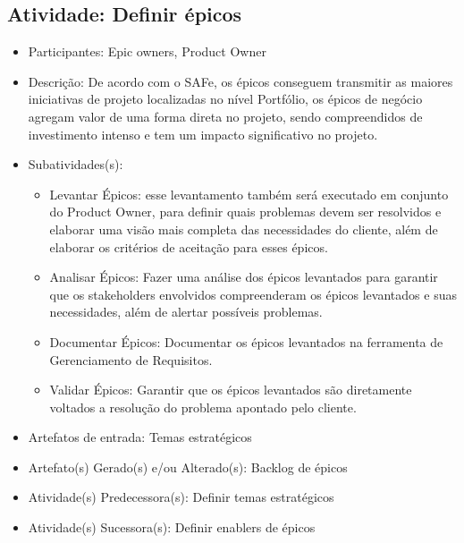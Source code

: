 \subsection{Atividade: Definir épicos}
\begin{itemize}
\item Participantes: Epic owners, Product Owner

\item Descrição: De acordo com o SAFe, os épicos conseguem transmitir as maiores iniciativas de projeto localizadas no nível Portfólio, os épicos de negócio agregam valor de uma forma direta no projeto, sendo compreendidos de investimento intenso e tem um impacto significativo no projeto. 

\item Subatividades(s): 
	\begin{itemize}
  	\item Levantar Épicos: esse levantamento também será executado em conjunto do Product Owner, para definir quais problemas devem ser resolvidos e elaborar uma visão mais completa das necessidades do cliente, além de elaborar os critérios de aceitação para esses épicos.
    \item Analisar Épicos: Fazer uma análise dos épicos levantados para garantir que os stakeholders envolvidos compreenderam os épicos levantados e suas necessidades, além de alertar possíveis problemas.
    \item Documentar Épicos:  Documentar os épicos levantados na ferramenta de Gerenciamento de Requisitos.
    \item Validar Épicos: Garantir que os épicos levantados são diretamente voltados a resolução do problema apontado pelo cliente.
    \end{itemize}
    
\item Artefatos de entrada: Temas estratégicos
 
\item Artefato(s) Gerado(s) e/ou Alterado(s): Backlog de épicos
\item Atividade(s) Predecessora(s): Definir temas estratégicos
\item Atividade(s) Sucessora(s): Definir enablers de épicos

\end{itemize}